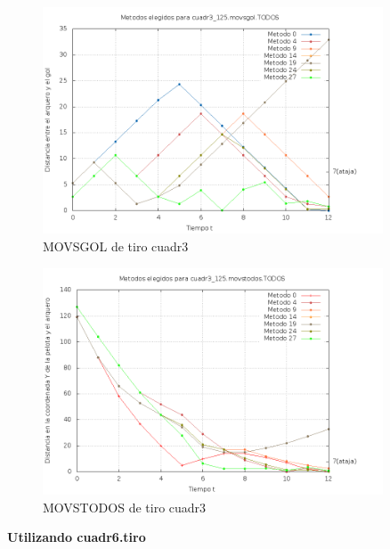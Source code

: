 \begin{figure}[H]
\begin{center}
\includegraphics[width=0.9\textwidth]{img/cuadr3_125_movsgol_TODOS_elegidos.png}
     \caption{MOVSGOL de tiro cuadr3}
\end{center}
\end{figure}


\begin{figure}[H]
\begin{center}
\includegraphics[width=0.9\textwidth]{img/cuadr3_125_movstodos_TODOS_elegidos.png}
     \caption{MOVSTODOS de tiro cuadr3}
\end{center}
\end{figure}

\textbf{Utilizando cuadr6.tiro}

